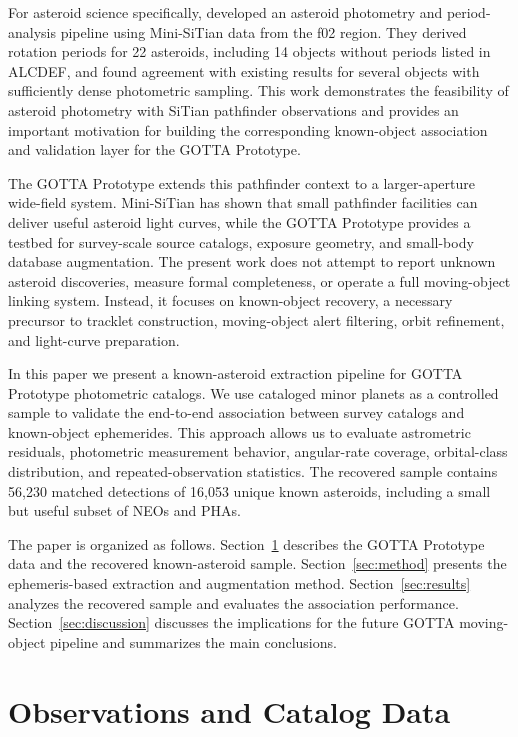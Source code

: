 \documentclass[referee]{raa}
\begin{document}
For asteroid science specifically, \citet{LiuZhaoxing2025} developed an asteroid photometry and period-analysis pipeline using Mini-SiTian data from the f02 region. They derived rotation periods for 22 asteroids, including 14 objects without periods listed in ALCDEF, and found agreement with existing results for several objects with sufficiently dense photometric sampling. This work demonstrates the feasibility of asteroid photometry with SiTian pathfinder observations and provides an important motivation for building the corresponding known-object association and validation layer for the GOTTA Prototype.

The GOTTA Prototype extends this pathfinder context to a larger-aperture wide-field system. Mini-SiTian has shown that small pathfinder facilities can deliver useful asteroid light curves, while the GOTTA Prototype provides a testbed for survey-scale source catalogs, exposure geometry, and small-body database augmentation. The present work does not attempt to report unknown asteroid discoveries, measure formal completeness, or operate a full moving-object linking system. Instead, it focuses on known-object recovery, a necessary precursor to tracklet construction, moving-object alert filtering, orbit refinement, and light-curve preparation.

In this paper we present a known-asteroid extraction pipeline for GOTTA Prototype photometric catalogs. We use cataloged minor planets as a controlled sample to validate the end-to-end association between survey catalogs and known-object ephemerides. This approach allows us to evaluate astrometric residuals, photometric measurement behavior, angular-rate coverage, orbital-class distribution, and repeated-observation statistics. The recovered sample contains 56,230 matched detections of 16,053 unique known asteroids, including a small but useful subset of NEOs and PHAs.

The paper is organized as follows. Section~\ref{sec:data} describes the GOTTA Prototype data and the recovered known-asteroid sample. Section~\ref{sec:method} presents the ephemeris-based extraction and augmentation method. Section~\ref{sec:results} analyzes the recovered sample and evaluates the association performance. Section~\ref{sec:discussion} discusses the implications for the future GOTTA moving-object pipeline and summarizes the main conclusions.

\section{Observations and Catalog Data}
\label{sec:data}
\end{document}
